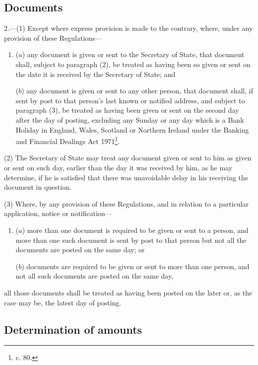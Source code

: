 \documentclass[12pt,a4paper]{article}
\begin{document}
\subsection[2. Documents]{Documents}

2.—(1) Except where express provision is made to the contrary, where,
under any provision of these Regulations—
\begin{enumerate}\item[]
($a$) any document is given or sent to the Secretary of State, that document shall,
subject to paragraph (2), be treated as having been so given or sent on the date
it is received by the Secretary of State; and

($b$) any document is given or sent to any other person, that document shall, if
sent by post to that person’s last known or notified address, and subject to
paragraph (3), be treated as having been given or sent on the second day after
the day of posting, excluding any Sunday or any day which is a Bank Holiday in
England, Wales, Scotland or Northern Ireland under the Banking and Financial
Dealings Act 1971\footnote{ c. 80.}.
\end{enumerate}

(2) The Secretary of State may treat any document given or sent to him as given
or sent on such day, earlier than the day it was received by him, as he may
determine, if he is satisfied that there was unavoidable delay in his receiving
the document in question.

(3) Where, by any provision of these Regulations, and in relation to a
particular application, notice or notification—
\begin{enumerate}\item[]
($a$) more than one document is required to be given or sent to a person, and more
than one such document is sent by post to that person but not all the documents
are posted on the same day; or

($b$) documents are required to be given or sent to more than one person, and not
all such documents are posted on the same day,
\end{enumerate}
all those documents shall be treated as having been posted on the later or, as
the case may be, the latest day of posting.

\subsection[3. Determination of amounts]{Determination of amounts}
\end{document}

